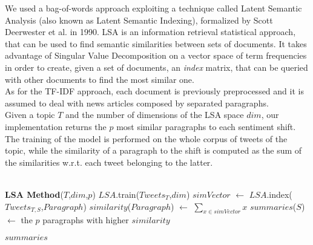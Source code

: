 We used a bag-of-words approach exploiting a technique called Latent Semantic Analysis (also known as Latent Semantic Indexing), formalized by Scott Deerwester et al. in 1990\cite{LSA}. LSA is an information retrieval statistical approach, that can be used to find semantic similarities between sets of documents. It takes advantage of Singular Value Decomposition on a vector space of term frequencies in order to create, given a set of documents, an \emph{index} matrix, that can be queried with other documents to find the most similar one.
\\
As for the TF-IDF approach, each document is previously preprocessed and it is assumed to deal with news articles composed by separated paragraphs.
\\
Given a topic $T$ and the number of dimensions of the LSA space $dim$, our implementation returns the $p$ most similar paragraphs to each sentiment shift. The training of the model is performed on the whole corpus of tweets of the topic, while the similarity of a paragraph to the shift is computed as the sum of the similarities w.r.t. each tweet belonging to the latter.
\\\\
\begin{algorithmic}
\STATE \textbf{LSA Method}($T$,$dim$,$p$)
\STATE
\STATE $LSA$.train($Tweets_T$,$dim$)
\STATE
{}
			\STATE $simVector$ $\leftarrow$ $LSA$.index($Tweets_{T,S}$,$Paragraph$)
			\STATE $similarity$($Paragraph$) $\leftarrow$ $\sum_{x \in simVector} x $
		\ENDFOR
	\ENDFOR
	\STATE $summaries$($S$) $\leftarrow$ the $p$ paragraphs with higher $similarity$

\ENDFOR
\STATE
\RETURN $summaries$

\end{algorithmic}
